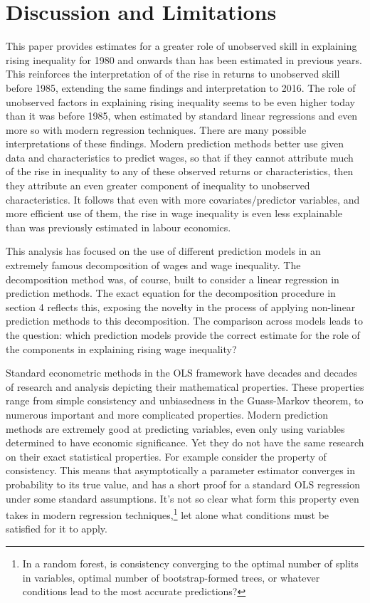 \documentclass[notitlepage,12pt]{article}
\begin{document}
\section{Discussion and Limitations}

This paper provides estimates for a greater role of unobserved skill in explaining rising inequality for 1980 and onwards than has been estimated in previous years.  This reinforces the interpretation of \cite{juhn1993wage} of the rise in returns to unobserved skill before 1985, extending the same findings and interpretation to 2016.  The role of unobserved factors in explaining rising inequality seems to be even higher today than it was before 1985, when estimated by standard linear regressions and even more so with modern regression techniques.  There are many possible interpretations of these findings.  Modern prediction methods better use given data and characteristics to predict wages, so that if they cannot attribute much of the rise in inequality to any of these observed returns or characteristics, then they attribute an even greater component of inequality to unobserved characteristics.  It follows that even with more covariates/predictor variables, and more efficient use of them, the rise in wage inequality is even less explainable than was previously estimated in labour economics.

This analysis has focused on the use of different prediction models in an extremely famous decomposition of wages and wage inequality.  The decomposition method was, of course, built to consider a linear regression in prediction methods.  The exact equation for the decomposition procedure in section 4 reflects this, exposing the novelty in the process of applying non-linear prediction methods to this decomposition.  The comparison across models leads to the question: which prediction models provide the correct estimate for the role of the components in explaining rising wage inequality? 

Standard econometric methods in the OLS framework have decades and decades of research and analysis depicting their mathematical properties.  These properties range from simple consistency and unbiasedness in the Guass-Markov theorem, to numerous important and more complicated properties.  Modern prediction methods are extremely good at predicting variables, even only using variables determined to have economic significance.  Yet they do not have the same research on their exact statistical properties.  For example consider the property of consistency.  This means that asymptotically a parameter estimator converges in probability  to its true value, and has a short proof for a standard OLS regression under some standard assumptions.  It's not so clear what form this property even takes in modern regression techniques,\footnote{In a random forest, is consistency converging to the optimal number of splits in variables, optimal number of bootstrap-formed trees, or whatever conditions lead to the most accurate predictions?} let alone what conditions must be satisfied for it to apply.
\end{document}
